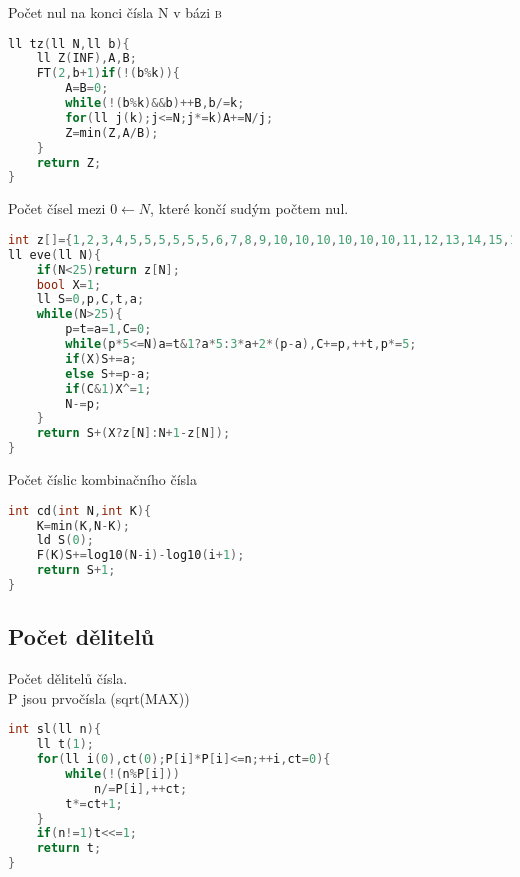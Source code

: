 \documentclass[11pt]{article}
\begin{document}
Počet nul na konci čísla \textsf{N} v bázi \textsc{b}
\begin{lstlisting}[language=C++]
ll tz(ll N,ll b){
    ll Z(INF),A,B;
    FT(2,b+1)if(!(b%k)){
        A=B=0;
        while(!(b%k)&&b)++B,b/=k;
        for(ll j(k);j<=N;j*=k)A+=N/j;
        Z=min(Z,A/B);
    }
    return Z;
}
\end{lstlisting}
Počet čísel mezi $0 \leftarrow N$, které končí sudým počtem nul.
\begin{lstlisting}[language=C++]
int z[]={1,2,3,4,5,5,5,5,5,5,6,7,8,9,10,10,10,10,10,10,11,12,13,14,15,16};
ll eve(ll N){
    if(N<25)return z[N];
    bool X=1;
    ll S=0,p,C,t,a;
    while(N>25){
        p=t=a=1,C=0;
        while(p*5<=N)a=t&1?a*5:3*a+2*(p-a),C+=p,++t,p*=5;
        if(X)S+=a;
        else S+=p-a;
        if(C&1)X^=1;
        N-=p;	
    }
    return S+(X?z[N]:N+1-z[N]);
}
\end{lstlisting}
Počet číslic kombinačního čísla
\begin{lstlisting}[language=C++]
int cd(int N,int K){
    K=min(K,N-K);
    ld S(0);
    F(K)S+=log10(N-i)-log10(i+1);
    return S+1;
}
\end{lstlisting}
\subsection{Počet dělitelů}
Počet dělitelů čísla.
\\\textsf{P} jsou prvočísla (sqrt(MAX))
\begin{lstlisting}[language=C++]
int sl(ll n){
    ll t(1);
    for(ll i(0),ct(0);P[i]*P[i]<=n;++i,ct=0){
        while(!(n%P[i]))
            n/=P[i],++ct;
        t*=ct+1;
    }
    if(n!=1)t<<=1;
    return t;
}
\end{lstlisting}
\end{document}
